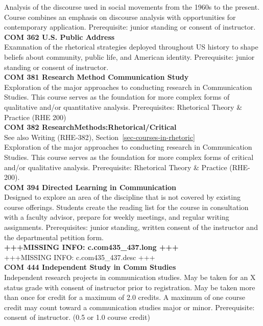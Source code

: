 \documentclass[
  letterpaper,
]{scrbook}
\begin{document}
Analysis of the discourse used in social movements from the 1960s to the
present. Course combines an emphasis on discourse analysis with
opportunities for contemporary application. Prerequisite: junior
standing or consent of instructor.\\
\textbf{COM 362 U.S. Public Address}\\
Examnation of the rhetorical strategies deployed throughout US history
to shape beliefs about community, public life, and American identity.
Prerequisite: junior standing or consent of instructor.\\
\textbf{COM 381 Research Method Communication Study}\\
Exploration of the major approaches to conducting research in
Communication Studies. This course serves as the foundation for more
complex forms of qualitative and/or quantitative analysis.
Prerequisites: Rhetorical Theory \& Practice (RHE 200)\\
\textbf{COM 382 ResearchMethods:Rhetorical/Critical}\\
See also Writing (RHE-382), Section~\ref{sec-courses-in-rhetoric}\\
Exploration of the major approaches to conducting research in
Communication Studies. This course serves as the foundation for more
complex forms of critical and/or qualitative analysis. Prerequisite:
Rhetorical Theory \& Practice (RHE-200).\\
\textbf{COM 394 Directed Learning in Communication}\\
Designed to explore an area of the discipline that is not covered by
existing course offerings. Students create the reading list for the
course in consultation with a faculty advisor, prepare for weekly
meetings, and regular writing assignments. Prerequisites: junior
standing, written consent of the instructor and the departmental
petition form.\\
\textbf{+++MISSING INFO: c.com435\_437.long +++}\\
+++MISSING INFO: c.com435\_437.desc +++\\
\textbf{COM 444 Independent Study in Comm Studies}\\
Independent research projects in communication studies. May be taken for
an X status grade with consent of instructor prior to registration. May
be taken more than once for credit for a maximum of 2.0 credits. A
maximum of one course credit may count toward a communication studies
major or minor. Prerequisite: consent of instructor. (0.5 or 1.0 course
credit)\\
\end{document}
